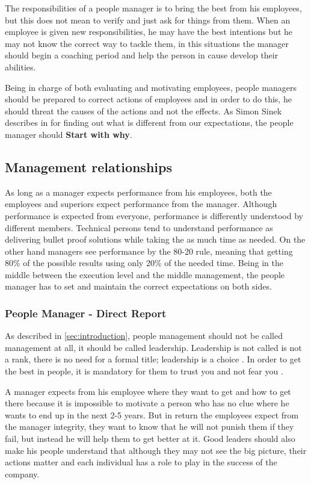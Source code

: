 The responsibilities of a people manager is to bring the best from his employees, but this does not mean to verify and just ask for things from them. When an employee is given new responsibilities, he may have the best intentions but he may not know the correct way to tackle them, in this situations the manager should begin a coaching period and help the person in cause develop their abilities.

Being in charge of both evaluating and motivating employees, people managers should be prepared to correct actions of employees and in order to do this, he should threat the causes of the actions and not the effects. As Simon Sinek describes in \cite{why} for finding out what is different from our expectations, the people manager should \textbf{Start with why}.
\subsection{Management relationships}
\label{subsec:relationships}
As long as a manager expects performance from his employees, both the employees and superiors expect performance from the manager. Although performance is expected from everyone, performance is differently understood by different members. Technical persons tend to understand performance as delivering bullet proof solutions while taking the as much time as needed. On the other hand managers see performance by the 80-20 rule, meaning that getting 80\% of the possible results using only 20\% of the needed time. Being in the middle between the execution level and the middle management, the people manager has to set and maintain the correct expectations on both sides.

\subsubsection{People Manager - Direct Report}
\label{sub-subsec:pmdr}
As described in \cref{sec:introduction}, people management should not be called management at all, it should be called leadership. Leadership is not called is not a rank, there is no need for a formal title; leadership is a choice \cite{safe}. In order to get the best in people, it is mandatory for them to trust you and not fear you . 

A manager expects from his employee where they want to get and how to get there because it is impossible to motivate a person who has no clue where he wants to end up in the next 2-5 years. But in return the employees expect from the manager integrity, they want to know that he will not punish them if they fail, but instead he will help them to get better at it. Good leaders should also make his people understand that although they may not see the big picture, their actions matter and each individual has a role to play in the success of the company.

